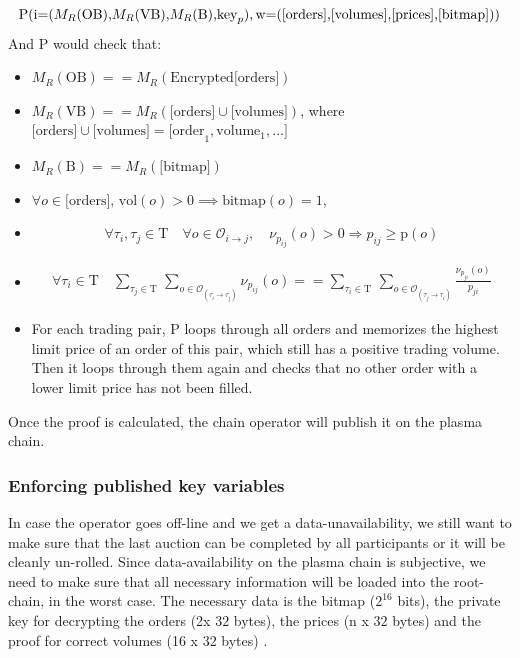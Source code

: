 \documentclass[11pt,parskip=full]{scrartcl}%
\newcommand{\Tau}{\mathrm{T}}
\def\pO{\mathcal{O}}
\def\ra{\rightarrow}
\begin{document}
\begin{equation}
\text{P(i=(}M_R\text{(OB),}M_R\text{(VB),}M_R\text{(B),} \text{key}_p),\\
\text{w=([orders],[volumes],[prices],[bitmap]))} 
\end{equation}
And P would check that:
\begin{itemize}
\item  $M_R(\text{OB}) == M_R(\text{Encrypted[orders]})$
\item  $M_R(\text{VB}) == M_R(\text{[orders]} \cup \text{[volumes]})$,\newline
where $\text{[orders]} \cup \text{[volumes]} = \text{[order}_1, \text{volume}_1, ...] $
\item $ M_R(\text{B}) == M_R(\text{[bitmap]})$
\item $\forall o \in \text{[orders], vol}(o)>0 \implies \text{bitmap}(o) = 1 $, 

\item 
\begin{equation}  \forall \tau_i ,\tau_j \in \Tau \quad \forall o \in \pO_{i\ra j}, \quad \nu_{p_{ij}}(o)>0 \Rightarrow p_{ij}\geq \text{p}(o)
\end{equation}
\item 
\begin{equation}
\begin{split}
\forall \tau_i \in \Tau \quad \sum_{\tau_j\in \Tau} \,
\sum_{ o\in \pO_{(\tau_i \rightarrow \tau_j)}} \nu_{p_{ij}}(o) == \sum_{\tau_i\in \Tau} \, \sum_{o\in \pO_{(\tau_j\rightarrow \tau_i)}} \frac{\nu_{p_{ji}}(o)}{p_{ji}}
\end{split}
\end{equation}
\item For each trading pair, P loops through all orders and memorizes the highest limit price of an order of this pair, which still has a positive trading volume. 
Then it loops through them again and checks that no other order with a lower limit price has not been filled. 
\end{itemize}

Once the proof is calculated, the chain operator will publish it on the plasma chain. 


\subsubsection{Enforcing published key variables}

\label{enforceAvailablity}
In case the operator goes off-line and we get a data-unavailability, we still want to make sure that the last auction can be completed by all participants or it will be cleanly un-rolled. 
Since data-availability on the plasma chain is subjective, we need to make sure that all necessary information will be loaded into the root-chain, in the worst case. 
The necessary data is the bitmap ($2^{16}$ bits), the private key for decrypting the orders (2x $32$ bytes), the prices (n x $32$ bytes) and the proof for correct volumes (16 x $32$ bytes) . 
\end{document}
